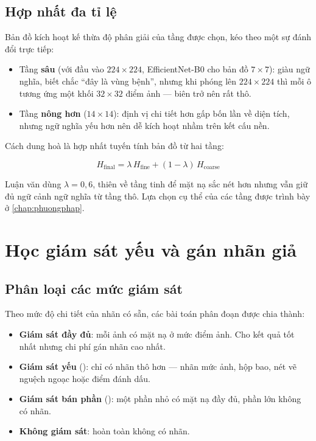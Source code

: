 \subsection{Hợp nhất đa tỉ lệ}

Bản đồ kích hoạt kế thừa độ phân giải của tầng được chọn, kéo theo một sự đánh
đổi trực tiếp:

\begin{itemize}
    \item Tầng \textbf{sâu} (với đầu vào $224 \times 224$, EfficientNet-B0 cho
          bản đồ $7 \times 7$): giàu ngữ nghĩa, biết chắc ``đây là vùng bệnh'',
          nhưng khi phóng lên $224 \times 224$ thì mỗi ô tương ứng một khối
          $32 \times 32$ điểm ảnh --- biên trở nên rất thô.
    \item Tầng \textbf{nông hơn} ($14 \times 14$): định vị chi tiết hơn gấp bốn
          lần về diện tích, nhưng ngữ nghĩa yếu hơn nên dễ kích hoạt nhầm trên
          kết cấu nền.
\end{itemize}

Cách dung hoà là hợp nhất tuyến tính bản đồ từ hai tầng:

\begin{equation}
    H_{\text{final}} = \lambda \, H_{\text{fine}} + (1 - \lambda) \, H_{\text{coarse}}
    \label{eq:multiscale}
\end{equation}

Luận văn dùng $\lambda = 0{,}6$, thiên về tầng tinh để mặt nạ sắc nét hơn nhưng
vẫn giữ đủ ngữ cảnh ngữ nghĩa từ tầng thô. Lựa chọn cụ thể của các tầng được trình
bày ở \cref{chap:phuongphap}.

\section{Học giám sát yếu và gán nhãn giả}
\label{sec:weaksup}

\subsection{Phân loại các mức giám sát}

Theo mức độ chi tiết của nhãn có sẵn, các bài toán phân đoạn được chia thành:

\begin{itemize}
    \item \textbf{Giám sát đầy đủ}: mỗi ảnh có mặt nạ ở mức điểm ảnh. Cho kết quả
          tốt nhất nhưng chi phí gán nhãn cao nhất.
    \item \textbf{Giám sát yếu} (): chỉ có nhãn thô hơn ---
          nhãn mức ảnh, hộp bao, nét vẽ nguệch ngoạc hoặc điểm đánh dấu.
    \item \textbf{Giám sát bán phần} (): một phần nhỏ có mặt
          nạ đầy đủ, phần lớn không có nhãn.
    \item \textbf{Không giám sát}: hoàn toàn không có nhãn.
\end{itemize}

